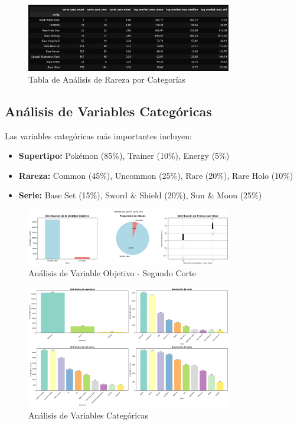 \documentclass[12pt,letterpaper]{article}
\begin{document}
\begin{figure}[H]
\centering
\includegraphics[width=0.8\textwidth]{imagenes/tabla_1_analisis_rareza.png}
\caption{Tabla de Análisis de Rareza por Categorías}
\label{fig:tabla_rareza}
\end{figure}

\subsection{Análisis de Variables Categóricas}

Las variables categóricas más importantes incluyen:
\begin{itemize}
    \item \textbf{Supertipo:} Pokémon (85\%), Trainer (10\%), Energy (5\%)
    \item \textbf{Rareza:} Common (45\%), Uncommon (25\%), Rare (20\%), Rare Holo (10\%)
    \item \textbf{Serie:} Base Set (15\%), Sword \& Shield (20\%), Sun \& Moon (25\%)
\end{itemize}

\begin{figure}[H]
\centering
\includegraphics[width=0.8\textwidth]{imagenes/figura_3_analisis_objetivo.png}
\caption{Análisis de Variable Objetivo - Segundo Corte}
\label{fig:analisis_objetivo}
\end{figure}

\begin{figure}[H]
\centering
\includegraphics[width=0.8\textwidth]{imagenes/figura_4_variables_categoricas.png}
\caption{Análisis de Variables Categóricas}
\label{fig:variables_categoricas}
\end{figure}
\end{document}
